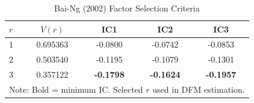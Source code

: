\begin{table}[htbp]
  \centering
  \caption{Bai-Ng (2002) Factor Selection Criteria}
  \label{tab:bai_ng}
  \begin{tabular}{lcccc}
    \hline\hline
    $r$ & $V(r)$ & IC1 & IC2 & IC3 \\
    \hline
    1 & 0.695363 & -0.0800 & -0.0742 & -0.0853 \\
    2 & 0.503540 & -0.1195 & -0.1079 & -0.1301 \\
    3 & 0.357122 & \textbf{-0.1798} & \textbf{-0.1624} & \textbf{-0.1957} \\
    \hline
    \multicolumn{5}{l}{\footnotesize Note: Bold = minimum IC. Selected $r$ used in DFM estimation.} \\
    \hline\hline
  \end{tabular}
\end{table}
